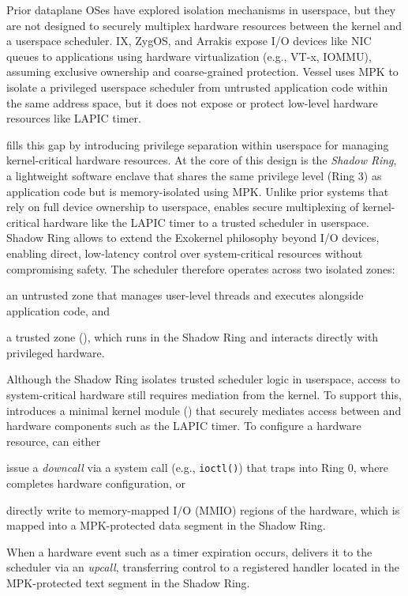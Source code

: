 Prior dataplane OSes have explored isolation mechanisms in userspace, but they are not designed to securely multiplex hardware resources between the kernel and a userspace scheduler.
IX, ZygOS, and Arrakis expose I/O devices like NIC queues to applications using hardware virtualization (e.g., VT-x, IOMMU), assuming exclusive ownership and coarse-grained protection.
Vessel uses MPK to isolate a privileged userspace scheduler from untrusted application code within the same address space, but it does not expose or protect low-level hardware resources like LAPIC timer.

\sysname fills this gap by introducing privilege separation within userspace for managing kernel-critical hardware resources.
At the core of this design is the \textit{Shadow Ring}, a lightweight software enclave that shares the same privilege level (Ring 3) as application code but is memory-isolated using MPK.
Unlike prior systems that rely on full device ownership to userspace, \sysname enables secure multiplexing of kernel-critical hardware like the LAPIC timer to a trusted scheduler in userspace.
Shadow Ring allows \sysname to extend the Exokernel philosophy beyond I/O devices, enabling direct, low-latency control over system-critical resources without compromising safety.
The \sysname scheduler therefore operates across two isolated zones:
\begin{enumerate*}[label=(\roman*)]
  \item an untrusted zone that manages user-level threads and executes alongside application code, and
  \item a trusted zone (\schedcore), which runs in the Shadow Ring and interacts directly with privileged hardware.
\end{enumerate*}

Although the Shadow Ring isolates trusted scheduler logic in userspace, access to system-critical hardware still requires mediation from the kernel.
To support this, \sysname introduces a minimal kernel module (\kmod) that securely mediates access between \schedcore and hardware components such as the LAPIC timer.
To configure a hardware resource, \schedcore can either 
\begin{enumerate*}[label=(\arabic*)]
  \item issue a \textit{downcall} via a system call (e.g., \texttt{ioctl()}) that traps into Ring 0, where \kmod completes hardware configuration, or
  \item directly write to memory-mapped I/O (MMIO) regions of the hardware, which is mapped into a MPK-protected data segment in the Shadow Ring.
\end{enumerate*}
When a hardware event such as a timer expiration occurs, \kmod delivers it to the scheduler via an \textit{upcall}, transferring control to a registered handler located in the MPK-protected text segment in the Shadow Ring.

